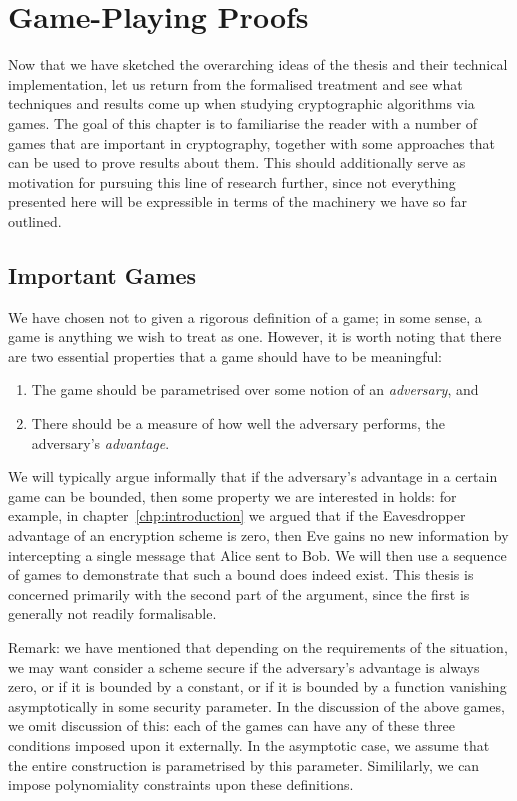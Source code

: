 \chapter{Game-Playing Proofs}

Now that we have sketched the overarching ideas of the thesis and their technical implementation, let us return from the
formalised treatment and see what techniques and results come up when studying cryptographic algorithms via games.  The
goal of this chapter is to familiarise the reader with a number of games that are important in cryptography, together
with some approaches that can be used to prove results about them.  This should additionally serve as motivation for
pursuing this line of research further, since not everything presented here will be expressible in terms of the
machinery we have so far outlined.

\section{Important Games}

We have chosen not to given a rigorous definition of a game; in some sense, a game is anything we wish to treat as one.
However, it is worth noting that there are two essential properties that a game should have to be meaningful:
\begin{enumerate}
    \item The game should be parametrised over some notion of an \emph{adversary}, and
    \item There should be a measure of how well the adversary performs, the adversary's \emph{advantage}.
\end{enumerate}

We will typically argue informally that if the adversary's advantage in a certain game can be bounded, then some
property we are interested in holds: for example, in chapter~\ref{chp:introduction} we argued that if the Eavesdropper
advantage of an encryption scheme is zero, then Eve gains no new information by intercepting a single message that Alice
sent to Bob.  We will then use a sequence of games to demonstrate that such a bound does indeed exist.  This thesis is
concerned primarily with the second part of the argument, since the first is generally not readily formalisable.

Remark: we have mentioned that depending on the requirements of the situation, we may want consider a scheme secure if
the adversary's advantage is always zero, or if it is bounded by a constant, or if it is bounded by a function vanishing
asymptotically in some security parameter.  In the discussion of the above games, we omit discussion of this: each of
the games can have any of these three conditions imposed upon it externally.  In the asymptotic case, we assume that the
entire construction is parametrised by this parameter.  Simililarly, we can impose polynomiality constraints upon these
definitions.

